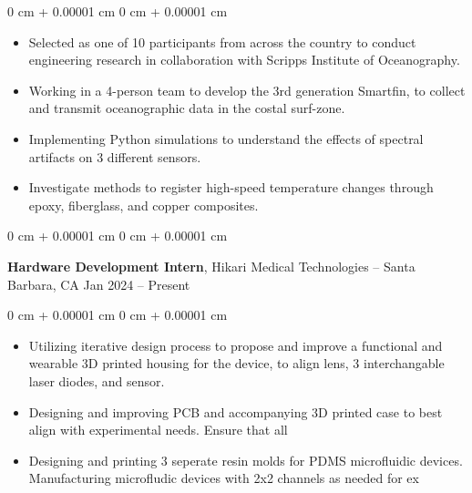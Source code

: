 \documentclass[10pt, letterpaper]{article}
\newenvironment{highlights}{
    \begin{itemize}[
        topsep=0.10 cm,
        parsep=0.10 cm,
        partopsep=0pt,
        itemsep=0pt,
        leftmargin=0 cm + 10pt
    ]
}{
    \end{itemize}
} %
\newenvironment{onecolentry}{
    \begin{adjustwidth}{
        0 cm + 0.00001 cm
    }{
        0 cm + 0.00001 cm
    }
}{
    \end{adjustwidth}
} %
\newenvironment{twocolentry}[2][]{
    \onecolentry
    \def\secondColumn{#2}
    \setcolumnwidth{\fill, 4.5 cm}
    \begin{paracol}{2}
}{
    \switchcolumn \raggedleft \secondColumn
    \end{paracol}
    \endonecolentry
} %
\begin{document}
    \vspace{0.10 cm}
    \begin{onecolentry}
        \begin{highlights}
            \item Selected as one of 10 participants from across the country to conduct engineering research in collaboration with Scripps Institute of Oceanography.
            \item Working in a 4-person team to develop the 3rd generation Smartfin, to collect and transmit oceanographic data in the costal surf-zone.
            \item Implementing Python simulations to understand the effects of spectral artifacts on 3 different sensors.
            \item Investigate methods to register high-speed temperature changes through epoxy, fiberglass, and copper composites.
        \end{highlights}
    \end{onecolentry}


    \vspace{0.2 cm}
    
    \begin{twocolentry}{
            Jan 2024 – Present
        }
            \textbf{Hardware Development Intern}, Hikari Medical Technologies -- Santa Barbara, CA\end{twocolentry}

        \vspace{0.10 cm}
        \begin{onecolentry}
            \begin{highlights}
                \item Utilizing iterative design process to propose and improve a functional and wearable 3D printed housing for the device, to align lens, 3 interchangable laser diodes, and sensor.
                \item Designing and improving PCB and accompanying 3D printed case to best align with experimental needs. Ensure that all 
                \item Designing and printing 3 seperate resin molds for PDMS microfluidic devices. Manufacturing microfludic devices with 2x2 channels as needed for ex
            \end{highlights}
        \end{onecolentry}

        \vspace{0.2 cm}
\end{document}
